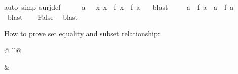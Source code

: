 \begin{isabellebody}
{}auto\ simp{}\ surj{}def{}\isanewline
\ \ \isamarkupfalse%
\ \isamarkupfalse%
\ a\ \ \ {}{}x{}\ x\ {}\ f\ x{}\ {}\ f\ a{}\ \ \isamarkupfalse%
\ blast\isanewline
\ \ \isamarkupfalse%
\ \ {}a\ {}\ f\ a\ {}\ a\ {}\ f\ a{}\ \ \isamarkupfalse%
\ blast\isanewline
\ \ \isamarkupfalse%
\ {}False{}\ \isamarkupfalse%
\ blast\isanewline
{}\isamarkupfalse%
%
\endisatagproof
{\isafoldproof}%
%
\isadelimproof
%
\endisadelimproof
%
\begin{isamarkuptext}%
How to prove set equality and subset relationship:
\end{isamarkuptext}%
\begin{tabular}{@ {}ll@ {}}
\begin{minipage}[t]{.4\textwidth}
\end{minipage}
&
\begin{minipage}[t]{.4\textwidth}

\end{minipage}
\end{tabular}
\end{isabellebody}
